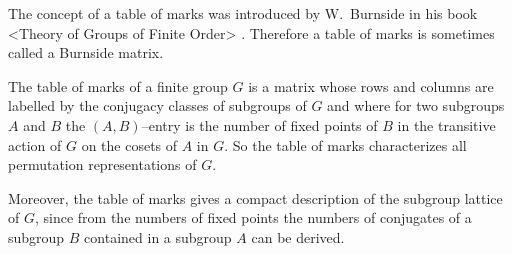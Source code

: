 
The concept of a table of marks was introduced by W.~Burnside in his book
<Theory of Groups of Finite  Order> \cite{Bur55}.   Therefore a table  of
marks is sometimes called a Burnside matrix.

The table  of marks of  a finite group $G$  is  a  matrix whose rows  and
columns are labelled by  the conjugacy classes of subgroups  of  $G$  and
where for  two subgroups $A$ and $B$ the $(A, B)$--entry is the number of
fixed points of $B$ in the transitive action of  $G$ on the cosets of $A$
in   $G$.   So   the  table   of  marks  characterizes   all  permutation
representations of $G$.

Moreover,  the table of marks gives a compact description of the subgroup
lattice of $G$,  since from the numbers  of  fixed points the numbers  of
conjugates of a subgroup $B$ contained in a subgroup $A$ can be derived.


